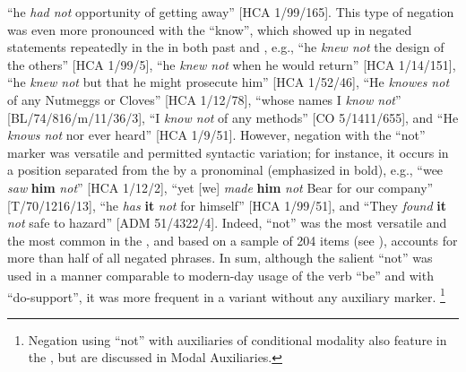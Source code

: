 “he \textit{had not} opportunity of getting away” [HCA 1/99/165]. This type of negation was even more pronounced with the  “know”, which showed up in negated statements repeatedly in the  in both past and , e.g., “he \textit{knew not} the design of the others” [HCA 1/99/5], “he \textit{knew not} when he would return” [HCA 1/14/151], “he \textit{knew not} but that he might prosecute him” [HCA 1/52/46], “He \textit{knowes not} of any Nutmeggs or Cloves” [HCA 1/12/78], “whose names I \textit{know not}” [BL/74/816/m/11/36/3], “I \textit{know not} of any methods” [CO 5/1411/655], and “He \textit{knows not} nor ever heard” [HCA 1/9/51]. However, negation with the “not” marker was versatile and permitted syntactic variation; for instance, it occurs in a position separated from the  by a pronominal  (emphasized in bold), e.g., “wee \textit{saw}\textbf{ }\textbf{him} \textit{not}” [HCA 1/12/2], “yet [we] \textit{made} \textbf{him} \textit{not} Bear for our company” [T/70/1216/13], “he \textit{has} \textbf{it} \textit{not} for himself” [HCA 1/99/51], and “They \textit{found} \textbf{it} \textit{not} safe to hazard” [ADM 51/4322/4]. Indeed, “not” was the most versatile and the most common  in the , and based on a sample of 204 items (see ), accounts for more than half of all negated  phrases. In sum, although the salient “not”  was used in a manner comparable to modern-day usage of the verb “be” and with “do-support”, it was more frequent in a variant  without any auxiliary marker. \footnote{Negation using “not” with auxiliaries of conditional modality also feature in the , but are discussed in  Modal Auxiliaries.} 

